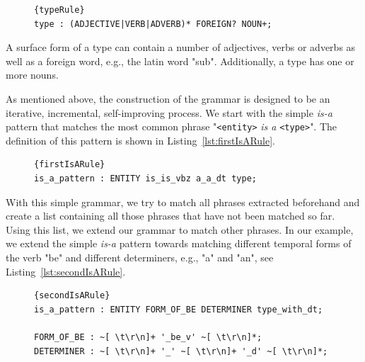 %  

\begin{figure}
\begin{lstlisting}[label=lst:typeRule, caption=The grammar rule defining a type surface form.]{typeRule}
type : (ADJECTIVE|VERB|ADVERB)* FOREIGN? NOUN+;
\end{lstlisting}
\end{figure}

A surface form of a type can contain a number of adjectives, verbs or adverbs as well as a foreign word, e.g., the latin word "sub".
Additionally, a type has one or more nouns.

As mentioned above, the construction of the grammar is designed to be an iterative, incremental, self-improving process.
We start with the simple \emph{is-a} pattern that matches the most common phrase "\texttt{<entity>} \emph{is a} \texttt{<type>}". 
The definition of this pattern is shown in Listing~\ref{lst:firstIsARule}.
\begin{figure}
\begin{lstlisting}[label=lst:firstIsARule,caption=First simple version of the \emph{is-a} pattern. \texttt{ENTITY} is a marking for the entities position.]{firstIsARule}
is_a_pattern : ENTITY is_is_vbz a_a_dt type;
\end{lstlisting}
\end{figure}

With this simple grammar, we try to match all phrases extracted beforehand and create a list containing all those phrases that have not been matched so far.
Using this list, we extend our grammar to match other phrases.
In our example, we extend the simple \emph{is-a} pattern towards matching different temporal forms of the verb "be" and different determiners, e.g., "a" and "an", see Listing~\ref{lst:secondIsARule}.

\begin{figure}
\begin{lstlisting}[label=lst:secondIsARule,caption=Extended version of the \emph{is-a} pattern.]{secondIsARule}
is_a_pattern : ENTITY FORM_OF_BE DETERMINER type_with_dt;

FORM_OF_BE : ~[ \t\r\n]+ '_be_v' ~[ \t\r\n]*;
DETERMINER : ~[ \t\r\n]+ '_' ~[ \t\r\n]+ '_d' ~[ \t\r\n]*;
\end{lstlisting}
\end{figure}

